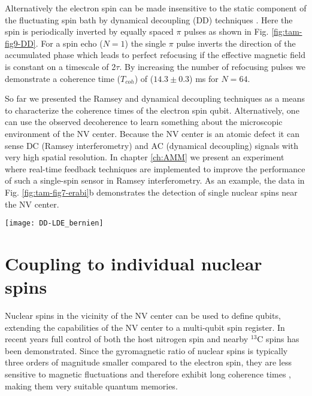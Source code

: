 Alternatively the electron spin can be made insensitive to the static component of the fluctuating spin bath by dynamical decoupling (DD) techniques \cite{Lange_Science_2010,Ryan_Phys.Rev.Lett._2010}. Here the spin is periodically inverted by equally spaced $\pi$ pulses as shown in Fig. \ref{fig:tam-fig9-DD}. For a spin echo ($N = 1$) the single $\pi$ pulse inverts the direction of the accumulated phase which leads to perfect refocusing if the effective magnetic field is constant on a timescale of 2$\tau$. By increasing the number of refocusing pulses we demonstrate a coherence time ($T_{coh}$) of ($14.3 \pm 0.3$) ms for $N = 64$.

So far we presented the Ramsey and dynamical decoupling techniques as a means to characterize the coherence times of the electron spin qubit. Alternatively, one can use the observed decoherence to learn something about the microscopic environment of the NV center. Because the NV center is an atomic defect it can sense DC (Ramsey interferometry) and AC (dynamical decoupling) signals with very high spatial resolution. In chapter \ref{ch:AMM} we present an experiment where real-time feedback techniques are implemented to improve the performance of such a single-spin sensor in Ramsey interferometry. As an example, the data in Fig. \ref{fig:tam-fig7-erabi}b demonstrates the detection of single nuclear spins near the NV center.

\begin{figure*}
	\centering
	\texttt{[image: DD-LDE\_bernien]}
	\caption{\label{fig:tam-fig9-DD} \textbf{Dynamical Decoupling of the electron spin.} The coherence of the electron spin as a function of the total free evolution time $t_{FE} = 2 \tau N$ during an $N$-pulse dynamical decoupling sequence\cite{Lange_Science_2010}. The solid lines are a fit to the function $A e^{(-\frac{t_{FE}}{T_{coh}})^3} + 0.5$. For $N = 64$ we find $T_{coh}$ = ($14.3 \pm 0.3$) ms. }
\end{figure*}

\section{Coupling to individual nuclear spins}
Nuclear spins in the vicinity of the NV center can be used to define qubits, extending the capabilities of the NV center to a multi-qubit spin register. In recent years full control of both the host nitrogen spin \cite{Gaebel_NatPhys_2006,Hanson_Phys.Rev.Lett._2006,Neumann_Science_2010,Fuchs_NatPhys_2011,vanderSar_Nature_2012} and nearby $^{13}$C spins \cite{Jelezko_Phys.Rev.Lett._2004,Dutt_Science_2007,Neumann_Science_2008,Jiang_Science_2009,Smeltzer_Phys.Rev.A_2009,Taminiau_Phys.Rev.Lett._2012} has been demonstrated. Since the gyromagnetic ratio of nuclear spins is typically three orders of magnitude smaller compared to the electron spin, they are less sensitive to magnetic fluctuations and therefore exhibit long coherence times \cite{Maurer_Science_2012}, making them very suitable quantum memories.

